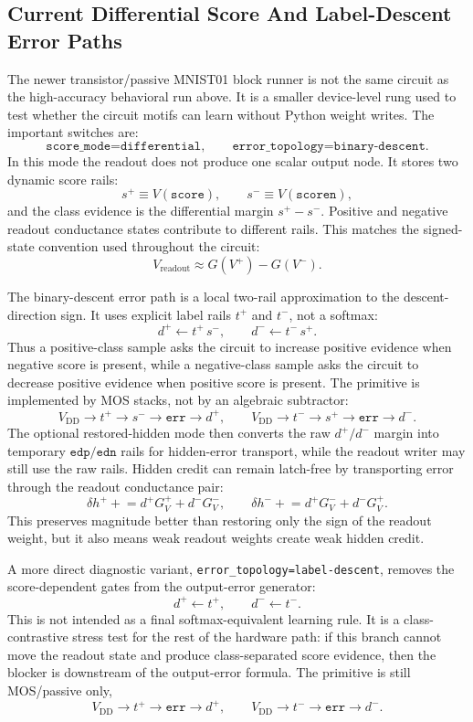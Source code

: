 \documentclass[11pt]{article}
\newcommand{\code}[1]{\texttt{#1}}
\begin{document}
\subsection{Current Differential Score And Label-Descent Error Paths}

The newer transistor/passive MNIST01 block runner is not the same circuit as
the high-accuracy behavioral run above.  It is a smaller device-level rung used
to test whether the circuit motifs can learn without Python weight writes.  The
important switches are:
\[
  \code{score\_mode=differential},\qquad
  \code{error\_topology=binary-descent}.
\]
In this mode the readout does not produce one scalar output node.  It stores two
dynamic score rails:
\[
  s^+ \equiv V(\code{score}),\qquad
  s^- \equiv V(\code{scoren}),
\]
and the class evidence is the differential margin \(s^+-s^-\).  Positive and
negative readout conductance states contribute to different rails.  This matches
the signed-state convention used throughout the circuit:
\[
  V_{\mathrm{readout}} \approx G(V^+) - G(V^-).
\]

The binary-descent error path is a local two-rail approximation to the
descent-direction sign.  It uses explicit label rails \(t^+\) and \(t^-\), not a
softmax:
\[
  d^+ \leftarrow t^+\,s^-,
  \qquad
  d^- \leftarrow t^-\,s^+ .
\]
Thus a positive-class sample asks the circuit to increase positive evidence
when negative score is present, while a negative-class sample asks the circuit
to decrease positive evidence when positive score is present.  The primitive is
implemented by MOS stacks, not by an algebraic subtractor:
\[
  V_{\mathrm{DD}}\rightarrow t^+\rightarrow s^-\rightarrow \code{err}\rightarrow d^+,
  \qquad
  V_{\mathrm{DD}}\rightarrow t^-\rightarrow s^+\rightarrow \code{err}\rightarrow d^- .
\]
The optional restored-hidden mode then converts the raw \(d^+/d^-\) margin into
temporary \(\code{edp}/\code{edn}\) rails for hidden-error transport, while the
readout writer may still use the raw rails.  Hidden credit can remain
latch-free by transporting error through the readout conductance pair:
\[
  \delta h^+ \mathrel{+}= d^+G_V^+ + d^-G_V^-,
  \qquad
  \delta h^- \mathrel{+}= d^+G_V^- + d^-G_V^+ .
\]
This preserves magnitude better than restoring only the sign of the readout
weight, but it also means weak readout weights create weak hidden credit.

A more direct diagnostic variant,
\code{error\_topology=label-descent}, removes the score-dependent gates from
the output-error generator:
\[
  d^+ \leftarrow t^+,\qquad d^- \leftarrow t^- .
\]
This is not intended as a final softmax-equivalent learning rule.  It is a
class-contrastive stress test for the rest of the hardware path: if this branch
cannot move the readout state and produce class-separated score evidence, then
the blocker is downstream of the output-error formula.  The primitive is still
MOS/passive only,
\[
  V_{\mathrm{DD}}\rightarrow t^+\rightarrow \code{err}\rightarrow d^+,
  \qquad
  V_{\mathrm{DD}}\rightarrow t^-\rightarrow \code{err}\rightarrow d^- .
\]
\end{document}
